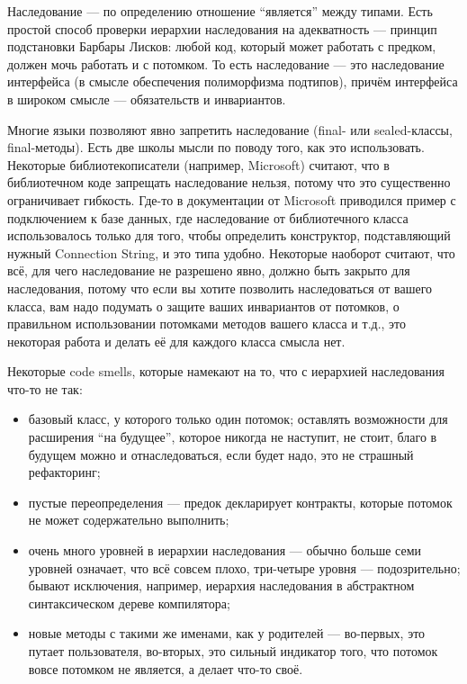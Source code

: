 \documentclass{../../text-style}
\begin{document}
Наследование --- по определению отношение ``является'' между типами. Есть простой способ проверки иерархии наследования на адекватность --- принцип подстановки Барбары Лисков: любой код, который может работать с предком, должен мочь работать и с потомком. То есть наследование --- это наследование интерфейса (в смысле обеспечения полиморфизма подтипов), причём интерфейса в широком смысле --- обязательств и инвариантов.

Многие языки позволяют явно запретить наследование (final- или sealed-классы, final-методы). Есть две школы мысли по поводу того, как это использовать. Некоторые библиотекописатели (например, Microsoft) считают, что в библиотечном коде запрещать наследование нельзя, потому что это существенно ограничивает гибкость. Где-то в документации от Microsoft приводился пример с подключением к базе данных, где наследование от библиотечного класса использовалось только для того, чтобы определить конструктор, подставляющий нужный Connection String, и это типа удобно. Некоторые наоборот считают, что всё, для чего наследование не разрешено явно, должно быть закрыто для наследования, потому что если вы хотите позволить наследоваться от вашего класса, вам надо подумать о защите ваших инвариантов от потомков, о правильном использовании потомками методов вашего класса и т.д., это некоторая работа и делать её для каждого класса смысла нет.

Некоторые code smells, которые намекают на то, что с иерархией наследования что-то не так:

\begin{itemize}
	\item базовый класс, у которого только один потомок; оставлять возможности для расширения ``на будущее'', которое никогда не наступит, не стоит, благо в будущем можно и отнаследоваться, если будет надо, это не страшный рефакторинг;
	\item пустые переопределения --- предок декларирует контракты, которые потомок не может содержательно выполнить;
	\item очень много уровней в иерархии наследования --- обычно больше семи уровней означает, что всё совсем плохо, три-четыре уровня --- подозрительно; бывают исключения, например, иерархия наследования в абстрактном синтаксическом дереве компилятора;
	\item новые методы с такими же именами, как у родителей --- во-первых, это путает пользователя, во-вторых, это сильный индикатор того, что потомок вовсе потомком не является, а делает что-то своё.
\end{itemize}
\end{document}
